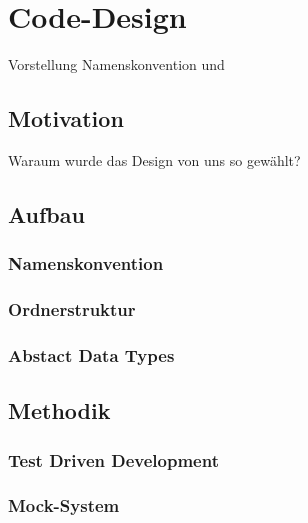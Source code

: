 \documentclass[../Report.tex]{subfiles}
\begin{document}
\chapter{Code-Design}
\label{chap:code}
Vorstellung Namenskonvention und

\section{Motivation}
\label{sec:code.motivation}
Waraum wurde das Design von uns so gewählt?


\section{Aufbau}
\label{sec:code.aufbau}


\subsection{Namenskonvention}
\label{subsec:code.namen}


\subsection{Ordnerstruktur}
\label{subsec:code.ordner}

\subsection{Abstact Data Types}
\label{subsec:code.adt}

\section{Methodik}
\label{subsec:code.methodik}

\subsection{Test Driven Development}
\label{subsec:code.tdd}

\subsection{Mock-System}
\label{subsec:code.mock}
\end{document}
